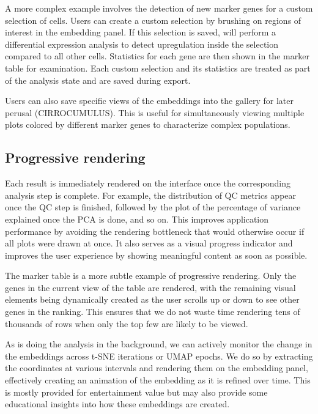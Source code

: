 \documentclass{article}
\begin{document}
A more complex example involves the detection of new marker genes for a custom selection of cells.
Users can create a custom selection by brushing on regions of interest in the embedding panel.
If this selection is saved,  will perform a differential expression analysis to detect upregulation inside the selection compared to all other cells.
Statistics for each gene are then shown in the marker table for examination.
Each custom selection and its statistics are treated as part of the analysis state and are saved during export.

Users can also save specific views of the embeddings into the gallery for later perusal (CIRROCUMULUS).
This is useful for simultaneously viewing multiple plots colored by different marker genes to characterize complex populations.

\subsection{Progressive rendering}

Each result is immediately rendered on the interface once the corresponding analysis step is complete.
For example, the distribution of QC metrics appear once the QC step is finished, followed by the plot of the percentage of variance explained once the PCA is done, and so on.
This improves application performance by avoiding the rendering bottleneck that would otherwise occur if all plots were drawn at once. 
It also serves as a visual progress indicator and improves the user experience by showing meaningful content as soon as possible.

The marker table is a more subtle example of progressive rendering.
Only the genes in the current view of the table are rendered, with the remaining visual elements being dynamically created as the user scrolls up or down to see other genes in the ranking.
This ensures that we do not waste time rendering tens of thousands of rows when only the top few are likely to be viewed.

As  is doing the analysis in the background, we can actively monitor the change in the embeddings across t-SNE iterations or UMAP epochs.
We do so by extracting the coordinates at various intervals and rendering them on the embedding panel,
effectively creating an animation of the embedding as it is refined over time.
This is mostly provided for entertainment value but may also provide some educational insights into how these embeddings are created.
\end{document}
